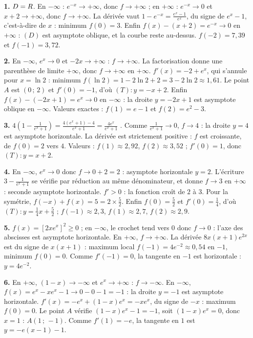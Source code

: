 \begin{corrige}[annales]
\textbf{1.} $D = R$. En $-\infty$ : $e^{-x} \to +\infty$, donc
$f \to +\infty$ ; en $+\infty$ : $e^{-x} \to 0$ et $x+2 \to +\infty$, donc
$f \to +\infty$. La dérivée vaut $1-e^{-x} = \frac{e^{x}-1}{e^{x}}$, du
signe de $e^{x}-1$, c'est-à-dire de $x$ : minimum $f(0) = 3$. Enfin
$f(x)-(x+2) = e^{-x} \to 0$ en $+\infty$ : $(D)$ est asymptote oblique, et
la courbe reste au-dessus. $f(-2) = 7{,}39$ et $f(-1) = 3{,}72$.

\textbf{2.} En $-\infty$, $e^{x} \to 0$ et $-2x \to +\infty$ :
$f \to +\infty$. La factorisation donne une parenthèse de limite $+\infty$,
donc $f \to +\infty$ en $+\infty$. $f'(x) = -2+e^{x}$, qui s'annule pour
$x = \ln2$ : minimum $f(\ln2) = 1-2\ln2+2 = 3-2\ln2 \approx 1{,}61$. Le
point $A$ est $(0\,;\,2)$ et $f'(0) = -1$, d'où $(T) : y = -x+2$. Enfin
$f(x)-(-2x+1) = e^{x} \to 0$ en $-\infty$ : la droite $y = -2x+1$ est
asymptote oblique en $-\infty$. Valeurs exactes : $f(1) = e-1$ et
$f(2) = e^{2}-3$.

\textbf{3.} $4\left(1-\frac{1}{e^{x}+1}\right)
= \frac{4\left(e^{x}+1\right)-4}{e^{x}+1} = \frac{4e^{x}}{e^{x}+1}$
\checkmark. Comme $\frac{1}{e^{x}+1} \to 0$, $f \to 4$ : la droite $y = 4$
est asymptote horizontale. La dérivée est strictement positive : $f$ est
croissante, de $f(0) = 2$ vers $4$. Valeurs : $f(1) \approx 2{,}92$,
$f(2) \approx 3{,}52$ ; $f'(0) = 1$, donc $(T) : y = x+2$.

\textbf{4.} En $-\infty$, $e^{x} \to 0$ donc $f \to 0+2 = 2$ : asymptote
horizontale $y = 2$. L'écriture $3-\frac{1}{e^{x}+1}$ se vérifie par
réduction au même dénominateur, et donne $f \to 3$ en $+\infty$ : seconde
asymptote horizontale. $f'>0$ : la fonction croît de $2$ à $3$. Pour la
symétrie, $f(-x)+f(x) = 5 = 2\times\frac52$. Enfin $f(0) = \frac52$ et
$f'(0) = \frac14$, d'où $(T) : y = \frac14x+\frac52$ ;
$f(-1) \approx 2{,}3$, $f(1) \approx 2{,}7$, $f(2) \approx 2{,}9$.

\textbf{5.} $f(x) = \left[2xe^{x}\right]^{2} \geq 0$ ; en $-\infty$, le
crochet tend vers $0$ donc $f \to 0$ : l'axe des abscisses est asymptote
horizontale. En $+\infty$, $f \to +\infty$. La dérivée
$8x(x+1)e^{2x}$ est du signe de $x(x+1)$ : maximum local
$f(-1) = 4e^{-2} \approx 0{,}54$ en $-1$, minimum $f(0) = 0$. Comme
$f'(-1) = 0$, la tangente en $-1$ est horizontale : $y = 4e^{-2}$.

\textbf{6.} En $+\infty$, $(1-x) \to -\infty$ et $e^{x} \to +\infty$ :
$f \to -\infty$. En $-\infty$, $f(x) = e^{x}-xe^{x}-1 \to 0-0-1 = -1$ : la
droite $y = -1$ est asymptote horizontale. $f'(x) = -e^{x}+(1-x)e^{x}
= -xe^{x}$, du signe de $-x$ : maximum $f(0) = 0$. Le point $A$ vérifie
$(1-x)e^{x}-1 = -1$, soit $(1-x)e^{x} = 0$, donc $x = 1$ : $A(1\,;\,-1)$.
Comme $f'(1) = -e$, la tangente en $1$ est $y = -e(x-1)-1$.


\end{corrige}
